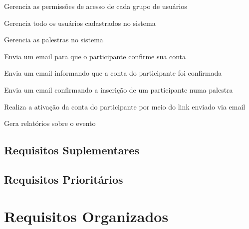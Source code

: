 \documentclass[12pt,a4paper]{article}
\begin{document}
				{}
				{%
				
				}
				
				{Gerencia as permissões de acesso de cada grupo de usuários}
				{%
				
				}
				
				{Gerencia todo os usuários cadastrados no sistema}
				{%
				
				}
				
				{Gerencia as palestras no sistema}
				{%
				
				}
				
				
				
				{Envia um email para que o participante confirme sua conta}
				{%
				
				}
				
				{Envia um email informando que a conta do participante foi confirmada}
				{%
				
				}

				{Envia um email confirmando a inscrição de um participante numa palestra}
				{%
				
				}
				
				{Realiza a ativação da conta do participante por meio do link enviado via email}
				{%
				
				}

				{Gera relatórios sobre o evento}
				{%
				
				}

        	\clearpage
        	\subsection{Requisitos Suplementares}
        	
        	\subsection{Requisitos Prioritários}
        	
        	\clearpage
        	\section{Requisitos Organizados}
\end{document}
